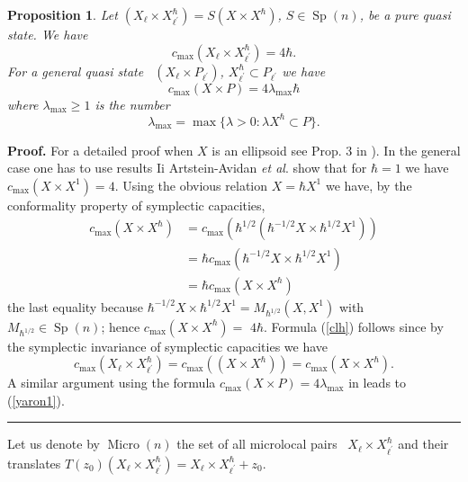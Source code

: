 \documentclass[11pt]{article}%
\newtheorem{proposition}[theorem]{Proposition}
\newenvironment{proof}[1][Proof]{\noindent\textbf{#1.} }{\ \rule{0.5em}{0.5em}}
\begin{document}
\begin{proposition}
Let $(X_{\ell}\times X_{\ell^{\prime}}^{\hbar})=S(X\times X^{\hbar})$,
$S\in\operatorname*{Sp}(n)$, be a pure quasi state. We have%
\begin{equation}
c_{\max}(X_{\ell}\times X_{\ell^{\prime}}^{\hbar})=4\hbar. \label{clh}%
\end{equation}
For a general quasi state \ $(X_{\ell}\times P_{\ell^{\prime}})$,
$X_{\ell^{\prime}}^{\hbar}\subset P_{\ell^{\prime}}$ we have
\begin{equation}
c_{\max}(X\times P)=4\lambda_{\max}\hbar\label{yaron1}%
\end{equation}
where $\lambda_{\max}\geq1$ is the number
\begin{equation}
\lambda_{\max}=\max\{\lambda>0:\lambda X^{\hbar}\subset P\}.
\end{equation}

\end{proposition}

\begin{proof}
For a detailed proof when $X$ is an ellipsoid see Prop. 3 in \cite{ACHAPOLAR}%
). In the general case one has to use results Ii \cite{Artstein}
Artstein-Avidan \textit{et al}. show that for $\hbar=1$ we have $c_{\max
}(X\times X^{1})=4$. Using the obvious relation $X=\hbar X^{1}$ we have, by
the conformality property of symplectic capacities,%
\begin{align*}
c_{\max}(X\times X^{\hbar})  &  =c_{\max}(\hbar^{1/2}(\hbar^{-1/2}X\times
\hbar^{1/2}X^{1}))\\
&  =\hbar c_{\max}(\hbar^{-1/2}X\times\hbar^{1/2}X^{1})\\
&  =\hbar c_{\max}(X\times X^{\hbar})
\end{align*}
the last equality because $\hbar^{-1/2}X\times\hbar^{1/2}X^{1}=M_{\hbar^{1/2}%
}(X,X^{1})$ with $M_{\hbar^{1/2}}\in\operatorname*{Sp}(n)$; hence $c_{\max
}(X\times X^{\hbar})=$ $4\hbar$. Formula (\ref{clh}) follows since by the
symplectic invariance of symplectic capacities we have
\[
c_{\max}(X_{\ell}\times X_{\ell^{\prime}}^{\hbar})=c_{\max}((X\times X^{\hbar
}))=c_{\max}(X\times X^{\hbar}).
\]
A similar argument using the formula $c_{\max}(X\times P)=4\lambda_{\max}$ in
\cite{Artstein} leads to (\ref{yaron1}).
\end{proof}

Let us denote by $\operatorname{Micro}(n)$ the set of all microlocal pairs
\ $X_{\ell}\times X_{\ell^{\prime}}^{\hbar}$ and their translates
$T(z_{0})(X_{\ell}\times X_{\ell^{\prime}}^{\hbar})=X_{\ell}\times
X_{\ell^{\prime}}^{\hbar}+z_{0}$.
\end{document}
